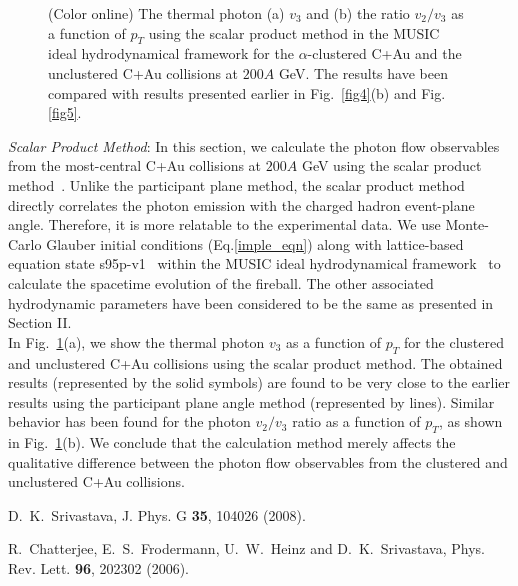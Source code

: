 \documentclass[aps,prc,twocolumn,floatfix,12pts,superscriptaddress]{revtex4}
\begin{document}
{{{\begin{figure}[htbp!]
		\vspace{-3mm}
		\caption {(Color online)  The thermal photon (a) $v_3$ and (b) the ratio  $v_2/v_3$ as a function of $p_T$ using the scalar product method in the MUSIC ideal hydrodynamical framework for the $\alpha$-clustered C+Au and the unclustered C+Au collisions at $200A$ GeV. The results have been compared with results presented earlier in Fig.~\ref{fig4}(b) and Fig.\ref{fig5}. }
		\label{fig7}
	\end{figure} 
	{{\it Scalar Product Method}}: In this section, we calculate the photon flow observables from the most-central  C+Au collisions at $200A$ GeV using the scalar product method~\cite{David:2019wpt,Shen:2013cca}. Unlike the participant plane method, the scalar product method directly correlates the photon emission with the charged hadron event-plane angle. Therefore, it is more relatable to the experimental data.
We use  Monte-Carlo Glauber initial conditions  (Eq.\ref{imple_eqn})  along with lattice-based equation state s95p-v1~\cite{Huovinen:2009yb} within the MUSIC ideal hydrodynamical framework~\cite{Schenke:2010nt} to calculate the spacetime evolution of the fireball. The other associated hydrodynamic parameters have been considered to be the same as presented in Section II.  \\

In Fig.~\ref{fig7}(a), we show the thermal photon $v_3$ as a function of $p_T$ for the clustered and unclustered C+Au collisions using the scalar product method. The obtained results (represented by the solid symbols) are found to be very close to the earlier results using the participant plane angle method (represented by lines). Similar behavior has been found for the photon $v_2/v_3$ ratio as a function of $p_T$, as shown in Fig.~\ref{fig7}(b). We conclude that the calculation method merely affects the qualitative difference between the photon flow observables from the clustered and unclustered C+Au collisions. }




\begin{thebibliography}{99}

D.~K.~Srivastava,
J. Phys. G \textbf{35}, 104026 (2008).
	
R.~Chatterjee, E.~S.~Frodermann, U.~W.~Heinz and D.~K.~Srivastava,
Phys. Rev. Lett. \textbf{96}, 202302 (2006).
	

\end{thebibliography}}}
\end{document}
